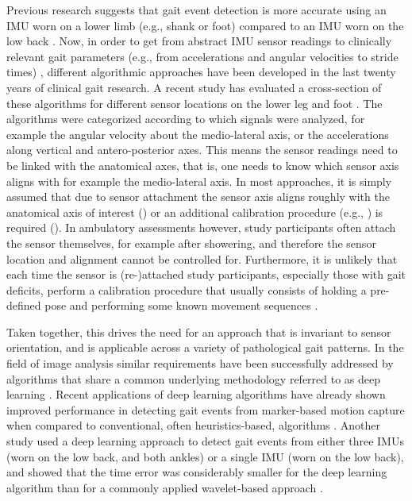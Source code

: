 \documentclass[sensors,article,submit,pdftex,moreauthors]{Definitions/mdpi}
\begin{document}
Previous research suggests that gait event detection is more accurate using an IMU worn on a lower limb (e.g., shank or foot) compared to an IMU worn on the low back \cite{BenMansour2015,Storm2016,Panebianco2018}. Now, in order to get from abstract IMU sensor readings to clinically relevant gait parameters (e.g., from accelerations and angular velocities to stride times) \cite{Hannink2016}, different algorithmic approaches have been developed in the last twenty years of clinical gait research. A recent study has evaluated a cross-section of these algorithms for different sensor locations on the lower leg and foot \cite{Niswander2021}. The algorithms were categorized according to which signals were analyzed, for example the angular velocity about the medio-lateral axis, or the accelerations along vertical and antero-posterior axes. This means the sensor readings need to be linked with the anatomical axes, that is, one needs to know which sensor axis aligns with for example the medio-lateral axis. In most approaches, it is simply assumed that due to sensor attachment the sensor axis aligns roughly with the anatomical axis of interest (\cite{Salarian2004,Sabatini2005,Jasiewicz2006,Catalfamo2010,Trojaniello2014,Maqbool2016,Romijnders2021}) or an additional calibration procedure (e.g., \cite{Ferraris1995}) is required (\cite{Greene2010,Niswander2021}). In ambulatory assessments however, study participants often attach the sensor themselves, for example after showering, and therefore the sensor location and alignment cannot be controlled for. Furthermore, it is unlikely that each time the sensor is (re-)attached study participants, especially those with gait deficits, perform a calibration procedure that usually consists of holding a pre-defined pose and performing some known movement sequences \cite{Leineweber2019,Pacher2020}. 

Taken together, this drives the need for an approach that is invariant to sensor orientation, and is applicable across a variety of pathological gait patterns. In the field of image analysis similar requirements have been successfully addressed by algorithms that share a common underlying methodology referred to as deep learning \cite{LeCun2015,Hannink2016,TerHaarRomeny2019}. Recent applications of deep learning algorithms have already shown improved performance in detecting gait events from marker-based motion capture when compared to conventional, often heuristics-based, algorithms \cite{Kidzinski2019,Lempereur2020,Filtjens2020}. Another study used a deep learning approach to detect gait events from either three IMUs (worn on the low back, and both ankles) or a single IMU (worn on the low back), and showed that the time error was considerably smaller for the deep learning algorithm than for a commonly applied wavelet-based approach \cite{Gadaleta2019}.
\end{document}
